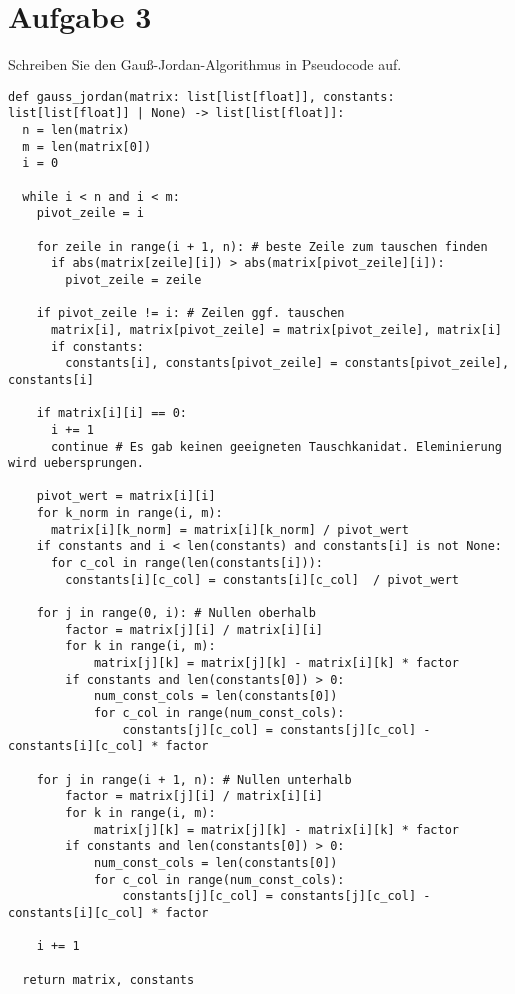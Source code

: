 \section{Aufgabe 3}
Schreiben Sie den Gauß-Jordan-Algorithmus in Pseudocode auf.
\begin{lstlisting}
def gauss_jordan(matrix: list[list[float]], constants: list[list[float]] | None) -> list[list[float]]:
  n = len(matrix)
  m = len(matrix[0])
  i = 0

  while i < n and i < m:
    pivot_zeile = i

    for zeile in range(i + 1, n): # beste Zeile zum tauschen finden
      if abs(matrix[zeile][i]) > abs(matrix[pivot_zeile][i]):
        pivot_zeile = zeile

    if pivot_zeile != i: # Zeilen ggf. tauschen
      matrix[i], matrix[pivot_zeile] = matrix[pivot_zeile], matrix[i]  
      if constants:
        constants[i], constants[pivot_zeile] = constants[pivot_zeile], constants[i]

    if matrix[i][i] == 0:
      i += 1
      continue # Es gab keinen geeigneten Tauschkanidat. Eleminierung wird uebersprungen.
        
    pivot_wert = matrix[i][i]
    for k_norm in range(i, m):
      matrix[i][k_norm] = matrix[i][k_norm] / pivot_wert
    if constants and i < len(constants) and constants[i] is not None:
      for c_col in range(len(constants[i])):
        constants[i][c_col] = constants[i][c_col]  / pivot_wert

    for j in range(0, i): # Nullen oberhalb
        factor = matrix[j][i] / matrix[i][i]
        for k in range(i, m):
            matrix[j][k] = matrix[j][k] - matrix[i][k] * factor
        if constants and len(constants[0]) > 0:
            num_const_cols = len(constants[0])
            for c_col in range(num_const_cols):
                constants[j][c_col] = constants[j][c_col] - constants[i][c_col] * factor

    for j in range(i + 1, n): # Nullen unterhalb
        factor = matrix[j][i] / matrix[i][i]
        for k in range(i, m):
            matrix[j][k] = matrix[j][k] - matrix[i][k] * factor
        if constants and len(constants[0]) > 0:
            num_const_cols = len(constants[0])
            for c_col in range(num_const_cols):
                constants[j][c_col] = constants[j][c_col] - constants[i][c_col] * factor
    
    i += 1

  return matrix, constants
  
\end{lstlisting} 